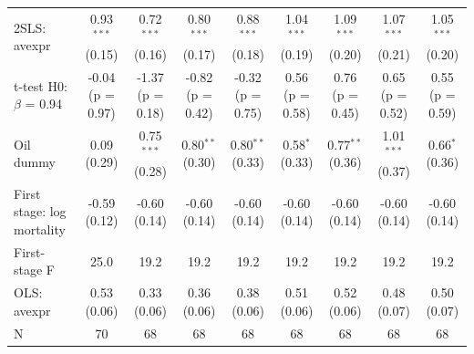 \begin{tabular}{lcccccccc}
2SLS: avexpr & 0.93$^{***}$ (0.15) & 0.72$^{***}$ (0.16) & 0.80$^{***}$ (0.17) & 0.88$^{***}$ (0.18) & 1.04$^{***}$ (0.19) & 1.09$^{***}$ (0.20) & 1.07$^{***}$ (0.21) & 1.05$^{***}$ (0.20) \\
t-test H0: $\beta$ = 0.94 & -0.04 (p = 0.97) & -1.37 (p = 0.18) & -0.82 (p = 0.42) & -0.32 (p = 0.75) & 0.56 (p = 0.58) & 0.76 (p = 0.45) & 0.65 (p = 0.52) & 0.55 (p = 0.59) \\
Oil dummy & 0.09 (0.29) & 0.75$^{***}$ (0.28) & 0.80$^{**}$ (0.30) & 0.80$^{**}$ (0.33) & 0.58$^{*}$ (0.33) & 0.77$^{**}$ (0.36) & 1.01$^{***}$ (0.37) & 0.66$^{*}$ (0.36) \\
First stage: log mortality & -0.59 (0.12) & -0.60 (0.14) & -0.60 (0.14) & -0.60 (0.14) & -0.60 (0.14) & -0.60 (0.14) & -0.60 (0.14) & -0.60 (0.14) \\
First-stage F & 25.0 & 19.2 & 19.2 & 19.2 & 19.2 & 19.2 & 19.2 & 19.2 \\
OLS: avexpr & 0.53 (0.06) & 0.33 (0.06) & 0.36 (0.06) & 0.38 (0.06) & 0.51 (0.06) & 0.52 (0.06) & 0.48 (0.07) & 0.50 (0.07) \\
N & 70 & 68 & 68 & 68 & 68 & 68 & 68 & 68 \\
\bottomrule
\end{tabular}
